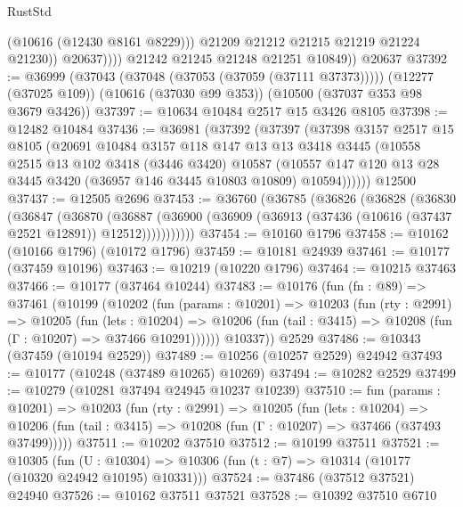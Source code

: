\begin{lexlean}{RustStd}
\begin{coremodule}
                      (@10616 (@12430 @8161 @8229)))
                    @21209
                    @21212
                    @21215
                    @21219
                    @21224
                    @21230))
                @20637))))
        @21242
        @21245
        @21248
        @21251
        @10849))
    @20637
@37392 := @36999
    (@37043 (@37048 (@37053 (@37059 (@37111 @37373)))))
    (@12277 (@37025 @109))
    (@10616 (@37030 @99 @353))
    (@10500 (@37037 @353 @98 @3679 @3426))
@37397 := @10634 @10484 @2517 @15 @3426 @8105
@37398 := @12482 @10484
@37436 := @36981
    (@37392
      (@37397
        (@37398
          @3157
          @2517
          @15
          @8105
          (@20691
            @10484
            @3157
            @118
            @147
            @13
            @13
            @3418
            @3445
            (@10558
              @2515
              @13
              @102
              @3418
              (@3446 @3420)
              @10587
              (@10557 @147 @120 @13 @28 @3445 @3420 (@36957 @146 @3445 @10803 @10809) @10594))))))
    @12500
@37437 := @12505 @2696
@37453 := @36760
    (@36785
      (@36826
        (@36828
          (@36830
            (@36847
              (@36870
                (@36887
                  (@36900 (@36909 (@36913 (@37436 (@10616 (@37437 @2521 @12891)) @12512)))))))))))
@37454 := @10160 @1796
@37458 := @10162 (@10166 @1796) (@10172 @1796)
@37459 := @10181 @24939
@37461 := @10177 (@37459 @10196)
@37463 := @10219 (@10220 @1796)
@37464 := @10215 @37463
@37466 := @10177 (@37464 @10244)
@37483 := @10176
    (fun (fn : @89) =>
    @37461
      (@10199
        (@10202
          (fun (params : @10201) =>
          @10203
            (fun (rty : @2991) =>
            @10205
              (fun (lets : @10204) =>
              @10206 (fun (tail : @3415) => @10208 (fun (Γ : @10207) => @37466 @10291))))))
        @10337))
    @2529
@37486 := @10343 (@37459 (@10194 @2529))
@37489 := @10256 (@10257 @2529) @24942
@37493 := @10177 (@10248 (@37489 @10265) @10269)
@37494 := @10282 @2529
@37499 := @10279 (@10281 @37494 @24945 @10237 @10239)
@37510 := fun (params : @10201) =>
  @10203
    (fun (rty : @2991) =>
    @10205
      (fun (lets : @10204) =>
      @10206 (fun (tail : @3415) => @10208 (fun (Γ : @10207) => @37466 (@37493 @37499)))))
@37511 := @10202 @37510
@37512 := @10199 @37511
@37521 := @10305
    (fun (U : @10304) => @10306 (fun (t : @7) => @10314 (@10177 (@10320 @24942 @10195) @10331)))
@37524 := @37486 (@37512 @37521) @24940
@37526 := @10162 @37511 @37521
@37528 := @10392 @37510 @6710

\end{coremodule}
\end{lexlean}
